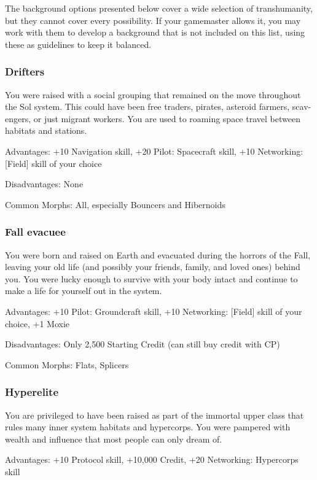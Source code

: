 The background options presented below cover a wide selection of transhumanity, but they cannot cover every possibility. If your gamemaster allows it, you may work with them to develop a background that is not included on this list, using these as guidelines to keep it balanced.

\subsubsection{Drifters}
\label{sec:drifters}

You were raised with a social grouping that remained on the move throughout the Sol system. This could have been free traders, pirates, asteroid farmers, scav- engers, or just migrant workers. You are used to roaming space travel between habitats and stations. 

Advantages: +10 Navigation skill, +20 Pilot: Spacecraft skill, +10 Networking: [Field] skill of your choice

Disadvantages: None

Common Morphs: All, especially Bouncers and Hibernoids

\subsubsection{Fall evacuee}
\label{sec:fall-evacuee}

You were born and raised on Earth and evacuated during the horrors of the Fall, leaving your old life (and possibly your friends, family, and loved ones) behind you. You were lucky enough to survive with your body intact and continue to make a life for yourself out in the system.

Advantages: +10 Pilot: Groundcraft skill, +10 Networking: [Field] skill of your choice, +1 Moxie

Disadvantages: Only 2,500 Starting Credit (can still buy credit with CP)

Common Morphs: Flats, Splicers

\subsubsection{Hyperelite}
\label{sec:hyperelite}

You are privileged to have been raised as part of the immortal upper class that rules many inner system habitats and hypercorps. You were pampered with wealth and influence that most people can only dream of.

Advantages: +10 Protocol skill, +10,000 Credit, +20 Networking: Hypercorps skill

